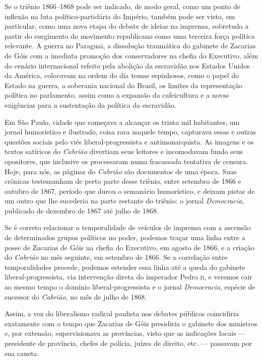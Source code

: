 Se o triênio 1866--1868 pode ser indicado, de modo geral, como um ponto
de inflexão na luta político-partidária do Império, também pode ser
visto, em particular, como uma nova etapa do debate de ideias na
imprensa, sobretudo a partir do surgimento do movimento republicano como
uma terceira força política relevante. A guerra no Paraguai, a
dissolução traumática do gabinete de Zacarias de Góis com a imediata
promoção dos conservadores na chefia do Executivo, além do cenário
internacional refeito pela abolição da escravidão nos Estados Unidos da
América, colocavam na ordem do dia temas espinhosos, como o papel do
Estado na guerra, a soberania nacional do Brasil, os limites da
representação política no parlamento, assim como a expansão da
cafeicultura e a novas exigências para a sustentação da política da
escravidão.

Em São Paulo, cidade que começava a alcançar os trinta mil habitantes,
um jornal humorístico e ilustrado, coisa rara naquele tempo, capturava
essas e outras questões sociais pelo viés liberal-progressista e
antimonarquista. As imagens e os textos satíricos do \emph{Cabrião}
divertiam seus leitores e incomodavam fundo seus opositores, que
inclusive os processaram numa fracassada tentativa de censura. Hoje,
para nós, as páginas do \emph{Cabrião} são documentos de uma época. Suas
crônicas testemunham de perto parte desse triênio, entre setembro de
1866 e outubro de 1867, período que durou o semanário humorístico, e
deixam pistas de um outro que lhe sucederia na parte restante do
triênio: o jornal \emph{Democracia}, publicado de dezembro de 1867 até
julho de 1868.

Se é correto relacionar a temporalidade de veículos de imprensa com a
ascensão de determinados grupos políticos no poder, podemos traçar uma
linha entre a posse de Zacarias de Góis na chefia do Executivo, em
agosto de 1866, e a criação do \emph{Cabrião} no mês seguinte, em
setembro de 1866. Se a correlação entre temporalidades procede, podemos
estender essa linha até a queda do gabinete liberal-progressista, via
intervenção direta do imperador Pedro \textsc{ii}, e veremos cair ao mesmo tempo
o domínio liberal-progressista e o jornal \emph{Democracia}, espécie de
sucessor do \emph{Cabrião}, no mês de julho de 1868.

Assim, a voz do liberalismo radical paulista nos debates públicos
coincidiria exatamente com o tempo que Zacarias de Góis presidiria o
gabinete dos ministros e, por extensão, supervisionava as províncias,
visto que as indicações locais --- presidente de província, chefes de
polícia, juízes de direito, etc. --- passavam por sua caneta.

